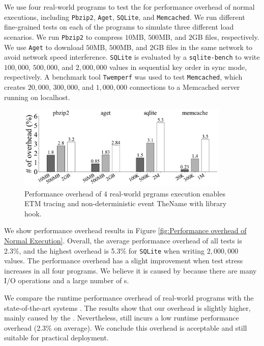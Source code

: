 We use four real-world programs to test the \TheName for performance overhead of
normal executions, including \texttt{Pbzip2}, \texttt{Aget}, \texttt{SQLite},
and \texttt{Memcached}. We run different fine-grained tests on each of the
programs to simulate three different load scenarios. We run \texttt{Pbzip2} to
compress $10$MB, $500$MB, and $2$GB files, respectively. We use \texttt{Aget} to
download $50$MB, $500$MB, and $2$GB files in the same network to
avoid network speed interference. \texttt{SQLite} is evaluated by a
\texttt{sqlite-bench} \cite{sqlitebench} to write $100,000$, $500,000$, and
$2,000,000$ values in sequential key order in sync mode, respectively. A
benchmark tool \texttt{Twemperf} \cite{twemperf} was used to test
\texttt{Memcached}, which creates $20,000$, $300,000$, and $1,000,000$
connections to a Memcached server running on localhost.

\begin{figure}
    \centering
    \includegraphics[width=0.9\textwidth]{figures/normaloverheadbar.pdf}
    \caption{Performance overhead of 4 real-world prgrams execution enables ETM tracing and non-deterministic event TheName with library hook.}
    \label{fig:Performance overhead of Normal Execution}
\end{figure}


We show performance overhead results in Figure \ref{fig:Performance overhead of
    Normal Execution}.
Overall, the average performance overhead of all tests is 2.3\%, and the highest
overhead is 5.3\% for \texttt{SQLite} when writing $2,000,000$ values. The
performance overhead has a slight improvement when test stress increases in all
four programs. We believe it is caused by \TheName because there are many I/O
operations and a large number of \syscall{}s.

We compare the runtime performance overhead of real-world programs with the
state-of-the-art systems \cite{cui2018rept, kasikci_lazy_2017}. The results show
that our overhead is slightly higher, mainly caused by the
\TheName. Nevertheless, \TheName still incurs a low runtime performance overhead
(2.3\% on average). We conclude this overhead is acceptable and still suitable for
practical deployment.

